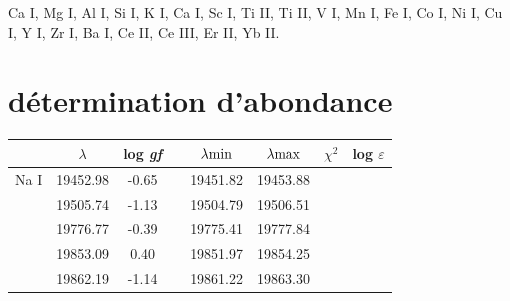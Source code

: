 \documentclass{article}
\begin{document}
Ca I, Mg I, Al I, Si I, K I, Ca I, Sc I, Ti II, Ti II, V I, Mn I, Fe I, Co I, Ni I, Cu I,
Y I, Zr I, Ba I, Ce II, Ce III, Er II, Yb II.  

\section{détermination d'abondance}
\begin{table}[h!]
  \vspace{0.3cm}
\begin{center}
	\begin{tabular}{cccccccc}
		\hline
    \hline
        &$\lambda$ & log \textit{gf}&& $\lambda{\rm min}$ & $\lambda{\rm max}$ & $\chi^2$ & log $\varepsilon$ \\
        \hline
        Na I & 19452.98& -0.65 && 19451.82 & 19453.88 & & \\
        & 19505.74& -1.13 && 19504.79 & 19506.51 & & \\
        & 19776.77& -0.39 && 19775.41 & 19777.84 & & \\
        & 19853.09& 0.40 && 19851.97 & 19854.25 & & \\
        & 19862.19& -1.14 && 19861.22 & 19863.30 & & \\
        \hline

\end{tabular}
\end{center}
\end{table}
\end{document}
